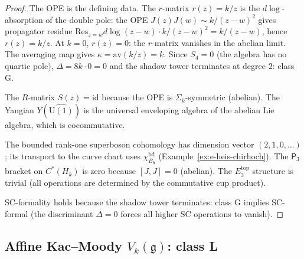 \documentclass[11pt,reqno]{amsart}
\theoremstyle{definition}
\theoremstyle{remark}
\providecommand{\fg}{\mathfrak{g}}
\providecommand{\Ethree}{E_3}
\providecommand{\Pthree}{\mathsf{P}_3}
\providecommand{\id}{\mathrm{id}}
\providecommand{\Res}{\mathrm{Res}}
\begin{document}
\begin{proof}
The OPE is the defining data. The $r$-matrix $r(z) = k/z$
is the $d\log$-absorption of the double pole: the OPE
$J(z)J(w) \sim k/(z-w)^2$ gives propagator residue
$\Res_{z=w} d\log(z-w) \cdot k/(z-w)^2 = k/(z-w)$, hence
$r(z) = k/z$. At $k = 0$, $r(z) = 0$: the $r$-matrix
vanishes in the abelian limit. The averaging map gives
$\kappa = \mathrm{av}(k/z) = k$. Since $S_4 = 0$ (the
algebra has no quartic pole), $\Delta = 8k \cdot 0 = 0$
and the shadow tower terminates at degree $2$: class G.

The $R$-matrix $S(z) = \id$ because the OPE is
$\Sigma_k$-symmetric (abelian). The Yangian
$Y(\widehat{\mathrm{U}(1)})$ is the universal enveloping
algebra of the abelian Lie algebra, which is cocommutative.

The bounded rank-one superboson cohomology has dimension vector
$(2,1,0,\ldots)$; its transport to the curve chart uses
$\chi^{\mathrm{bd}}_{B_{\mathfrak h}}$
(Example~\ref{ex:e-heis-chirhoch}). The $\Pthree$ bracket
on $C^*(H_k)$ is zero because $[J, J] = 0$ (abelian).
The $\Ethree^{\mathrm{top}}$ structure is trivial (all
operations are determined by the commutative cup product).

SC-formality holds because the shadow tower terminates:
class G implies SC-formal
(the discriminant $\Delta = 0$ forces all higher SC operations
to vanish).
\end{proof}

\subsection{Affine Kac--Moody $V_k(\fg)$: class L}
\end{document}
